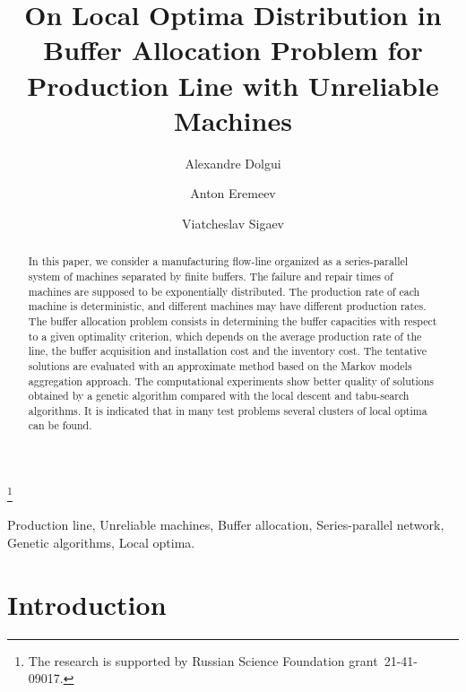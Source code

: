 \documentclass{ifacconf}
\begin{document}
\begin{frontmatter}

\title{On Local Optima Distribution in Buffer Allocation Problem for Production Line with Unreliable Machines} 

\thanks[footnoteinfo]{The research is supported by Russian Science Foundation  grant~21-41-09017.}

\author[First]{Alexandre Dolgui} 
\author[Second]{Anton Eremeev} 
\author[Third]{Viatcheslav Sigaev}

\address[First]{IMT Atlantique, Nantes, France}
\address[Second]{Sobolev Institute of Mathematics SB RAS, Novosibirsk, Russia (e-mail: eremeev@ofim.oscsbras.ru).}
\address[Third]{Avtomatika-Servis LLC, Omsk, Russia (e-mail: sigvs@yandex.ru).}


\begin{abstract}                %
In this paper, we consider a manufacturing flow-line
organized as a series-parallel system of machines separated by
finite buffers. The failure and repair times of machines are
supposed to be exponentially distributed. The production rate of
each machine is deterministic, and different machines may have
different production rates. The buffer allocation problem consists
in determining the buffer capacities with respect to a given
optimality criterion, which depends on the average production rate
of the line, the buffer acquisition and installation cost and the
inventory cost. The tentative solutions are evaluated with an
approximate method based on the Markov models aggregation
approach. The computational experiments show better quality of
solutions obtained by a genetic algorithm compared with the local
descent and tabu-search algorithms. It is indicated that in many
test problems several clusters of local optima can be found.
\end{abstract}

\begin{keyword}
Production line, Unreliable machines, Buffer allocation, Series-parallel network, Genetic algorithms, Local optima.
\end{keyword}

\end{frontmatter}

\section{Introduction}
\end{document}
